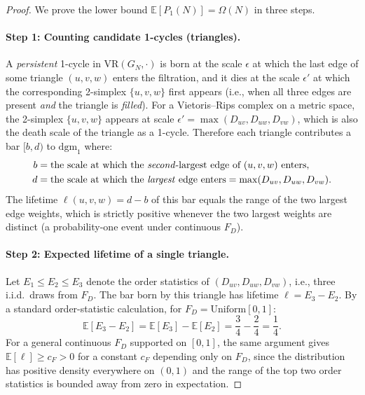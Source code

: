 \begin{proof}
We prove the lower bound $\mathbb{E}[P_1(N)] = \Omega(N)$ in three steps.

\paragraph{Step 1: Counting candidate 1-cycles (triangles).}
A \emph{persistent} 1-cycle in $\mathrm{VR}(G_N, \cdot)$ is born at the scale $\epsilon$
at which the last edge of some triangle $(u, v, w)$ enters the filtration, and it dies at the
scale $\epsilon'$ at which the corresponding 2-simplex $\{u,v,w\}$ first appears (i.e., when all
three edges are present \emph{and} the triangle is \emph{filled}).  For a Vietoris--Rips complex
on a metric space, the 2-simplex $\{u,v,w\}$ appears at scale $\epsilon' = \max(D_{uv}, D_{uw},
D_{vw})$, which is also the death scale of the triangle as a 1-cycle.  Therefore each triangle
contributes a bar $[b, d)$ to $\mathrm{dgm}_1$ where:
\begin{align}
    b &= \text{the scale at which the \emph{second}-largest edge of } (u,v,w) \text{ enters},\\
    d &= \text{the scale at which the \emph{largest} edge enters} = \max(D_{uv}, D_{uw}, D_{vw}).
\end{align}
The lifetime $\ell(u,v,w) = d - b$ of this bar equals the range of the two largest edge weights,
which is strictly positive whenever the two largest weights are distinct (a probability-one event
under continuous $F_D$).

\paragraph{Step 2: Expected lifetime of a single triangle.}
Let $E_1 \le E_2 \le E_3$ denote the order statistics of $(D_{uv}, D_{uw}, D_{vw})$, i.e.,
three i.i.d.\ draws from $F_D$.  The bar born by this triangle has lifetime
$\ell = E_3 - E_2$.
By a standard order-statistic calculation, for $F_D = \mathrm{Uniform}[0,1]$:
\[
    \mathbb{E}[E_3 - E_2] = \mathbb{E}[E_3] - \mathbb{E}[E_2]
    = \frac{3}{4} - \frac{2}{4} = \frac{1}{4}.
\]
For a general continuous $F_D$ supported on $[0,1]$, the same argument gives
$\mathbb{E}[\ell] \ge c_F > 0$ for a constant $c_F$ depending only on $F_D$, since the 
distribution has positive density everywhere on $(0,1)$ and the range of the top two order
statistics is bounded away from zero in expectation.


\end{proof}
